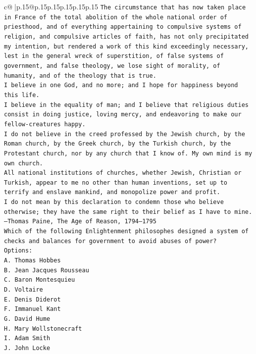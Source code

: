 \documentclass{article}
\begin{document}
{\begin{supertabular}{c@{$\;$}|p{.15\linewidth}@{}p{.15\linewidth}p{.15\linewidth}p{.15\linewidth}p{.15\linewidth}p{.15\linewidth}}
{{{\texttt{The circumstance that has now taken place in France of the total abolition of the whole national order of priesthood, and of everything appertaining to compulsive systems of religion, and compulsive articles of faith, has not only precipitated my intention, but rendered a work of this kind exceedingly necessary, lest in the general wreck of superstition, of false systems of government, and false theology, we lose sight of morality, of humanity, and of the theology that is true.} \\
\texttt{I believe in one God, and no more; and I hope for happiness beyond this life.} \\
\texttt{I believe in the equality of man; and I believe that religious duties consist in doing justice, loving mercy, and endeavoring to make our fellow{-}creatures happy.} \\
\texttt{I do not believe in the creed professed by the Jewish church, by the Roman church, by the Greek church, by the Turkish church, by the Protestant church, nor by any church that I know of. My own mind is my own church.} \\
\texttt{All national institutions of churches, whether Jewish, Christian or Turkish, appear to me no other than human inventions, set up to terrify and enslave mankind, and monopolize power and profit.} \\
\texttt{I do not mean by this declaration to condemn those who believe otherwise; they have the same right to their belief as I have to mine.} \\
\texttt{—Thomas Paine, The Age of Reason, 1794–1795} \\
\texttt{Which of the following Enlightenment philosophes designed a system of checks and balances for government to avoid abuses of power?} \\
\texttt{Options:} \\
\texttt{A. Thomas Hobbes} \\
\texttt{B. Jean Jacques Rousseau} \\
\texttt{C. Baron Montesquieu} \\
\texttt{D. Voltaire} \\
\texttt{E. Denis Diderot} \\
\texttt{F. Immanuel Kant} \\
\texttt{G. David Hume} \\
\texttt{H. Mary Wollstonecraft} \\
\texttt{I. Adam Smith} \\
\texttt{J. John Locke} \\
}}}
\end{supertabular}}
\end{document}
